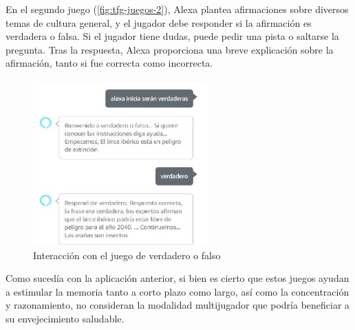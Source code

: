 En el segundo juego (\autoref{fig:tfg-juegos-2}), Alexa plantea afirmaciones sobre diversos temas de cultura general, y el jugador debe responder si la afirmación es verdadera o falsa. Si el jugador tiene dudas, puede pedir una pista o saltarse la pregunta. Tras la respuesta, Alexa proporciona una breve explicación sobre la afirmación, tanto si fue correcta como incorrecta.

\begin{figure}[H]
	\centering
	\includegraphics[width=0.6\textwidth]{imgs/tfg-juegos-2.JPG}
	\caption{Interacción con el juego de verdadero o falso}
	\label{fig:tfg-juegos-2}
\end{figure}

Como sucedía con la aplicación anterior, si bien es cierto que estos juegos ayudan a estimular la memoria tanto a corto plazo como largo, así como la concentración y razonamiento, no consideran la modalidad multijugador que podría beneficiar a su envejecimiento saludable.
